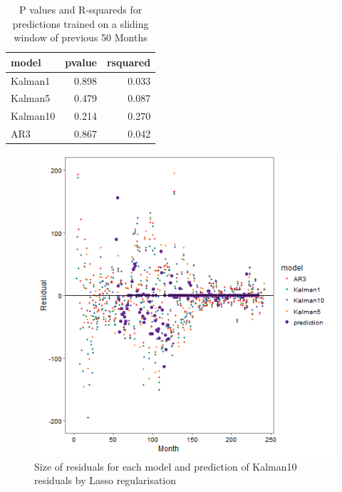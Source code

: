 \documentclass{sig-alternate-05-2015}
\begin{document}
\begin{table}[ht]
\centering
\begin{tabular}{lrr}
  \hline
\textbf{model} & \textbf{pvalue} & \textbf{rsquared} \\ 
  \hline
  \hline
Kalman1 & 0.898 & 0.033 \\ 
Kalman5 & 0.479 & 0.087 \\ 
Kalman10 & 0.214 & 0.270 \\ 
AR3 & 0.867 & 0.042 \\ 
  \hline
  \end{tabular}
\caption{P values and R-squareds for predictions trained on a sliding window of previous 50 Months}
\label{table:window.results}
\end{table}


\begin{figure}[ht]
	\includegraphics[width=\linewidth]{Residuals.png}
	\centering
	\caption{Size of residuals for each model and prediction of Kalman10 residuals by Lasso regularisation}
			\label{fig:Residuals}
\end{figure}
\end{document}
